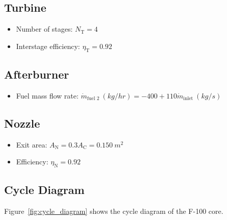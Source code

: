 \documentclass[11pt]{article} %
\begin{document}
\subsection{Turbine}
\begin{itemize}
\item Number of stages: $N_{\text{T}} = 4$
\item Interstage efficiency: $\eta_{\text{T}} = 0.92$
\end{itemize}

\subsection{Afterburner}
\begin{itemize}
\item Fuel mass flow rate: $\dot m_{\text{fuel 2}}\ (\si{kg/hr}) = -400 + 110 \dot m_{\text{inlet}}\ (\si{kg/s})$
\end{itemize}

\subsection{Nozzle}
\begin{itemize}
\item Exit area: $A_{\text{N}} = 0.3A_{\text{C}} = 0.150\ \si{m^2}$
\item Efficiency: $\eta_{\text{N}} = 0.92$
\end{itemize}


\subsection{Cycle Diagram}
\noindent Figure~\ref{fig:cycle_diagram} shows the cycle diagram of the F-100 core.
\end{document}
